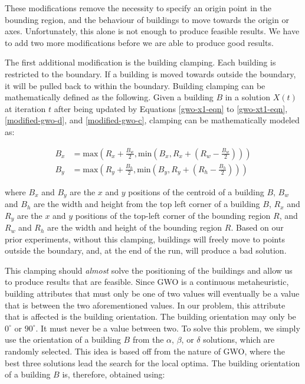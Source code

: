 These modifications remove the necessity to specify an origin point in the bounding region, and the behaviour of buildings to move towards the origin or axes. Unfortunately, this alone is not enough to produce feasible results. We have to add two more modifications before we are able to produce good results.

The first additional modification is the building clamping. Each building is restricted to the boundary. If a building is moved towards outside the boundary, it will be pulled back to within the boundary. Building clamping can be mathematically defined as the following. Given a building $B$ in a solution $X(t)$ at iteration $t$ after being updated by Equations \ref{gwo-x1-eqn} to \ref{gwo-xt1-eqn}, \ref{modified-gwo-d}, and \ref{modified-gwo-c}, clamping can be mathematically modeled as:

\begin{align}
	B_{x} &= \text{max}\left (R_{x} + \frac{B_{w}}{2}, \text{min}\left(B_{x}, R_{x} + \left(R_{w} - \frac{B_{w}}{2}\right)\right)\right ) \\
	B_{y} &= \text{max}\left (R_{y} + \frac{B_{h}}{2}, \text{min}\left(B_{y}, R_{y} + \left(R_{h} - \frac{B_{h}}{2}\right)\right)\right )
\end{align}

where $B_{x}$ and $B_{y}$ are the $x$ and $y$ positions of the centroid of a building $B$, $B_{w}$ and $B_{h}$ are the width and height from the top left corner of a building $B$, $R_{x}$ and $R_{y}$ are the $x$ and $y$ positions of the top-left corner of the bounding region $R$, and $R_{w}$ and $R_{h}$ are the width and height of the bounding region $R$. Based on our prior experiments, without this clamping, buildings will freely move to points outside the boundary, and, at the end of the run, will produce a bad solution. 

This clamping should \textit{almost} solve the positioning of the buildings and allow us to produce results that are feasible. Since GWO is a continuous metaheuristic, building attributes that must only be one of two values will eventually be a value that is between the two aforementioned values. In our problem, this attribute that is affected is the building orientation. The building orientation may only be $0^{\circ}$ or $90^{\circ}$. It must never be a value between two. To solve this problem, we simply use the orientation of a building $B$ from the $\alpha$, $\beta$, or $\delta$ solutions, which are randomly selected. This idea is based off from the nature of GWO, where the best three solutions lead the search for the local optima. The building orientation of a building $B$ is, therefore, obtained using:

